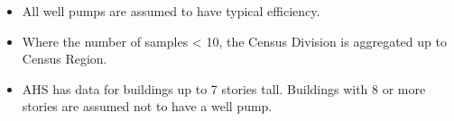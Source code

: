 \begin{itemize}
\item All well pumps are assumed to have typical efficiency.
\item Where the number of samples < 10, the Census Division is aggregated up to Census Region.
\item AHS has data for buildings up to 7 stories tall. Buildings with 8 or more stories are assumed not to have a well pump.
\end{itemize}
